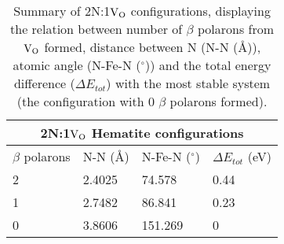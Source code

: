 
\begin{table}[t!]
\begin{center}
\begin{tabular}{p{1.9cm}p{1.9cm}p{1.9cm}p{1.9cm}}
 \hline
 \multicolumn{4}{c}{ 2N:1$\text{V}_\text{O}$ Hematite configurations \vspace{0.5mm}} \\
 \hline
 $\beta$ polarons & N-N ({\AA}) & N-Fe-N ($^{\circ}$)& $\Delta E_{tot}$ (eV) \\
 \hline
 2  & 2.4025 & 74.578 & 0.44 \\
 1  & 2.7482 & 86.841 & 0.23 \\
 0  & 3.8606 & 151.269 & \hspace{1mm} 0 \\
 \hline
\end{tabular}
\end{center}
\caption{Summary of 2N:1$\text{V}_\text{O}$ configurations, displaying the relation between number of $\beta$ polarons from $\text{V}_\text{O}$ formed, distance between N (N-N ({\AA})), atomic angle (N-Fe-N ($^{\circ}$)) and the total energy difference ($\Delta E_{tot}$) with the most stable system (the configuration with 0 $\beta$ polarons formed).} \label{fe2o3:table:n2vo}
\end{table}


